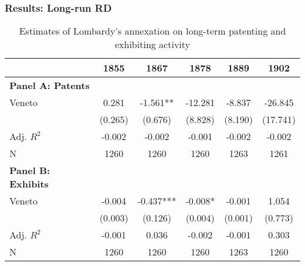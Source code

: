 \documentclass[10pt]{beamer}
\begin{document}
\begin{frame}
    \frametitle{Results: Long-run RD}

        \begin{table}
        \centering
        \caption{Estimates of Lombardy's annexation on long-term patenting and exhibiting activity\label{tab:patent}}
            \begin{tabular}{lccccc}  %
            \toprule
            & 1855 & 1867 & 1878 & 1889 & 1902 \\ \midrule %
            \textbf{Panel A: Patents}  &&&& \\
            Veneto     & 0.281   & -1.561** & -12.281 & -8.837  & -26.845  \\
            & (0.265) & (0.676)  & (8.828) & (8.190) & (17.741) \\
            Adj. $R^2$ & -0.002  & -0.002   & -0.001  & -0.002  & -0.002   \\
            N          & 1260    & 1260     & 1260    & 1263    & 1261     \\       \midrule
            \textbf{Panel B: Exhibits} &&&& \\
            Veneto     & -0.004  & -0.437*** & -0.008* & -0.001  & 1.054   \\
            & (0.003) & (0.126)   & (0.004) & (0.001) & (0.773) \\
            Adj. $R^2$ & -0.001  & 0.036     & -0.002  & -0.001  & 0.303   \\
            N          & 1260    & 1260      & 1260    & 1263    & 1260  \\
            \bottomrule
            \end{tabular}
        
        \end{table}

\end{frame}
\end{document}
